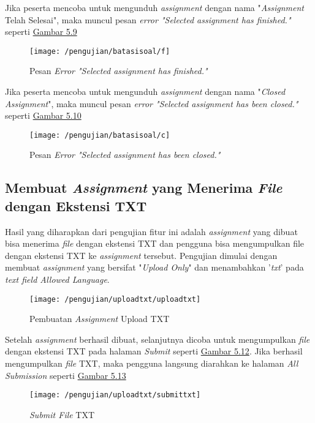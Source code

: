 	Jika peserta mencoba untuk mengunduh \textit{assignment} dengan nama "\textit{Assignment} Telah Selesai", maka muncul pesan \textit{error "Selected assignment has finished."} seperti \hyperref[fig:f]{Gambar 5.9} 
	\begin{figure}[H]
		\centering  
		\texttt{[image: /pengujian/batasisoal/f]}  
		\caption[Pesan\textit{ Error "Selected assignment has finished."}]{Pesan \textit{Error "Selected assignment has finished."}} 
		\label{fig:f} 
	\end{figure}

	Jika peserta mencoba untuk mengunduh \textit{assignment} dengan nama "\textit{Closed Assignment}", maka muncul pesan \textit{error "Selected assignment has been closed."} seperti \hyperref[fig:c]{Gambar 5.10} 
	\begin{figure}[H]
		\centering  
		\texttt{[image: /pengujian/batasisoal/c]}  
		\caption[Pesan \textit{Error "Selected assignment has been closed."}]{Pesan \textit{Error "Selected assignment has been closed."}} 
		\label{fig:c} 
	\end{figure}

	\subsection{Membuat \textit{Assignment} yang Menerima \textit{File} dengan Ekstensi TXT}
	Hasil yang diharapkan dari pengujian fitur ini adalah \textit{assignment} yang dibuat bisa menerima \textit{file} dengan ekstensi TXT dan pengguna bisa mengumpulkan file dengan ekstensi TXT ke \textit{assignment} tersebut. Pengujian dimulai dengan membuat \textit{assignment} yang bersifat "\textit{Upload Only}" dan menambahkan '\textit{txt}' pada \textit{text field Allowed Language}.
	\begin{figure}[H]
		\centering  
		\texttt{[image: /pengujian/uploadtxt/uploadtxt]}  
		\caption[Pembuatan \textit{Assignment} Upload TXT]{Pembuatan \textit{Assignment} Upload TXT} 
		\label{fig:uploadtxt} 
	\end{figure}
	
	Setelah \textit{assignment} berhasil dibuat, selanjutnya dicoba untuk mengumpulkan \textit{file} dengan ekstensi TXT pada halaman \textit{Submit} seperti \hyperref[fig:submittxt]{Gambar 5.12}. Jika berhasil mengumpulkan \textit{file} TXT, maka pengguna langsung diarahkan ke halaman \textit{All Submission} seperti \hyperref[fig:resultttxt]{Gambar 5.13}
	
	\begin{figure}[H]
		\centering  
		\texttt{[image: /pengujian/uploadtxt/submittxt]}  
		\caption[\textit{Submit File} TXT]{\textit{Submit File} TXT} 
		\label{fig:submittxt} 
	\end{figure}

